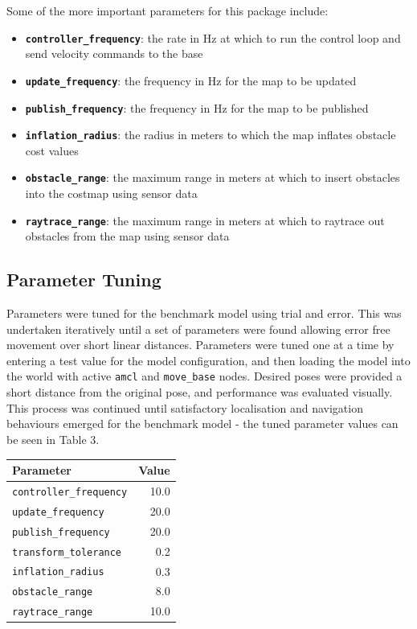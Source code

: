 \documentclass[a4paper]{article}
\begin{document}
Some of the more important parameters for this package include:
\begin{itemize}
\item \textbf{\texttt{controller\_frequency}}: the rate in $\si{\hertz}$ at which to run the control loop and send velocity commands to the base
\item \textbf{\texttt{update\_frequency}}: the frequency in $\si{\hertz}$ for the map to be updated
\item \textbf{\texttt{publish\_frequency}}: the frequency in $\si{\hertz}$ for the map to be published
\item \textbf{\texttt{inflation\_radius}}: the radius in meters to which the map inflates obstacle cost values
\item \textbf{\texttt{obstacle\_range}}: the maximum range in meters at which to insert obstacles into the costmap using sensor data
\item \textbf{\texttt{raytrace\_range}}: the maximum range in meters at which to raytrace out obstacles from the map using sensor data
\end{itemize}

\subsection{Parameter Tuning}
\begin{minipage}{0.55\textwidth}
Parameters were tuned for the benchmark model using trial and error. This was undertaken iteratively until a set of parameters were found allowing error free movement over short linear distances. Parameters were tuned one at a time by entering a test value for the model configuration, and then loading the model into the world with active \texttt{amcl} and \texttt{move\_base} nodes. Desired poses were provided a short distance from the original pose, and performance was evaluated visually. This process was continued until satisfactory localisation and navigation behaviours emerged for the benchmark model - the tuned parameter values can be seen in Table 3.
\end{minipage}
\hspace{0.75cm}
\begin{minipage}{0.35\textwidth}
\centering
{}
\begin{tabular}{lr}
\toprule
\textbf{Parameter} & \textbf{Value}\\
\midrule
\texttt{controller\_frequency} & 10.0 \\
\texttt{update\_frequency} & 20.0 \\
\texttt{publish\_frequency} & 20.0 \\
\texttt{transform\_tolerance} & 0.2 \\
\texttt{inflation\_radius} & 0.3 \\
\texttt{obstacle\_range} & 8.0\\
\texttt{raytrace\_range} & 10.0\\
\bottomrule
\end{tabular}
\end{minipage}
\end{document}
